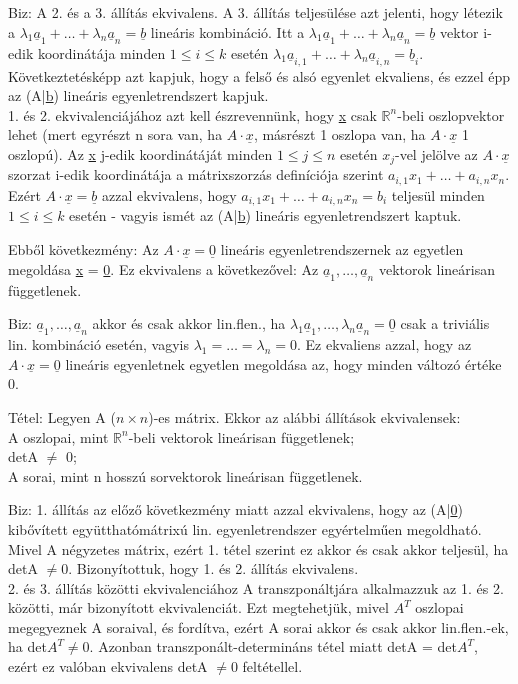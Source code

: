 \documentclass[]{article}
\newcommand{\Rn}[1]{$\mathbb{R}^{#1}$}
\newcommand{\Und}[1]{\underline{#1}}
\begin{document}
\begin{leftbar}
Biz: A 2. és a 3. állítás ekvivalens. A 3. állítás teljesülése azt jelenti, hogy létezik a $\lambda_1\Und{a}_1 + \ldots + \lambda_n\Und{a}_n = \Und{b}$ lineáris kombináció. Itt a $\lambda_1\Und{a}_1 + \ldots + \lambda_n\Und{a}_n = \Und{b}$ vektor i-edik koordinátája minden $1 \leq i \leq k$ esetén $\lambda_1\Und{a}_{i,1} + \ldots + \lambda_n\Und{a}_{i, n} = \Und{b}_i$. Következtetésképp azt kapjuk, hogy a felső és alsó egyenlet ekvaliens, és ezzel épp az (A|\Und{b}) lineáris egyenletrendszert kapjuk.\\
1. és 2. ekvivalenciájához azt kell észrevennünk, hogy \Und{x} csak \Rn{n}-beli oszlopvektor lehet (mert egyrészt n sora van, ha $A \cdot \Und{x}$, másrészt 1 oszlopa van, ha $A \cdot \Und{x}$ 1 oszlopú). Az \Und{x} j-edik koordinátáját minden $1 \leq j \leq n$ esetén $x_j$-vel jelölve az $A \cdot \Und{x}$ szorzat i-edik koordinátája a mátrixszorzás definíciója szerint $a_{i,1}x_1+\ldots+a_{i,n}x_n$. Ezért $A \cdot \Und{x} = \Und{b}$ azzal ekvivalens, hogy $a_{i,1}x_1+\ldots+a_{i,n}x_n = b_i$ teljesül minden $1 \leq i \leq k$ esetén - vagyis ismét az (A|\Und{b}) lineáris egyenletrendszert kaptuk.
\end{leftbar}
Ebből következmény: Az $A \cdot \Und{x} = \Und{0}$ lineáris egyenletrendszernek az egyetlen megoldása \Und{x} = \Und{0}. Ez ekvivalens a következővel: 
Az $\Und{a}_1,\ldots,\Und{a}_n$ vektorok lineárisan függetlenek.
\begin{leftbar}
Biz: $\Und{a}_1,\ldots,\Und{a}_n$ akkor és csak akkor lin.flen., ha $\lambda_1\Und{a}_1,\ldots,\lambda_n\Und{a}_n = \Und{0}$ csak a triviális lin. kombináció esetén, vagyis $\lambda_1 = \ldots = \lambda_n = 0$. Ez ekvaliens azzal, hogy az $A \cdot \Und{x} = \Und{0}$ lineáris egyenletnek egyetlen megoldása az, hogy minden változó értéke 0.
\end{leftbar}
\begin{framed}
Tétel: Legyen A ($n \times n$)-es mátrix. Ekkor az alábbi állítások ekvivalensek:\\
A oszlopai, mint \Rn{n}-beli vektorok lineárisan függetlenek;\\
detA $\neq$ 0;\\
A sorai, mint n hosszú sorvektorok lineárisan függetlenek.
\end{framed}
\begin{leftbar}
Biz: 1. állítás az előző következmény miatt azzal ekvivalens, hogy az (A|\Und{0}) kibővített együtthatómátrixú lin. egyenletrendszer egyértelműen megoldható. Mivel A négyzetes mátrix, ezért 1. tétel szerint ez akkor és csak akkor teljesül, ha detA $\neq 0$. Bizonyítottuk, hogy 1. és 2. állítás ekvivalens.\\
2. és 3. állítás közötti ekvivalenciához A transzponáltjára alkalmazzuk az 1. és 2. közötti, már bizonyított ekvivalenciát. Ezt megtehetjük, mivel $A^T$ oszlopai megegyeznek A soraival, és fordítva, ezért A sorai akkor és csak akkor lin.flen.-ek, ha det$A^T \neq 0$. Azonban transzponált-determináns tétel miatt detA = det$A^T$, ezért ez valóban ekvivalens detA $\neq 0$ feltétellel.
\end{leftbar}
\end{document}
